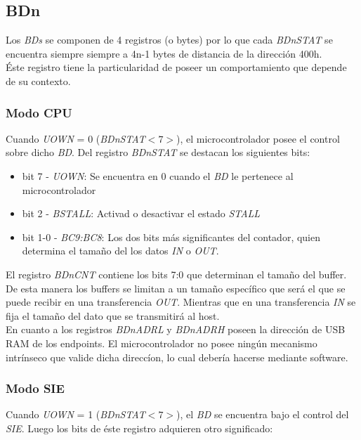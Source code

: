 \subsection{BDn}
Los \emph{BDs} se componen de 4 registros (o bytes) por lo que cada
\emph{BDnSTAT} se encuentra siempre siempre a 4n-1 bytes de distancia de la
direcci\'on 400h.\\

\'Este registro tiene la particularidad de poseer un comportamiento que
depende de su contexto.

\subsubsection{Modo CPU}
Cuando \emph{UOWN} = 0 (\emph{BDnSTAT$<7>$}), el microcontrolador posee el
control sobre dicho \emph{BD}. Del registro \emph{BDnSTAT} se destacan los
siguientes bits:

\begin{itemize}
 \item bit 7 - \emph{UOWN}: Se encuentra en 0 cuando el \emph{BD} le pertenece
al microcontrolador

 \item bit 2 - \emph{BSTALL}: Activad o desactivar el estado \emph{STALL}

 \item bit 1-0 - \emph{BC9:BC8}: Los dos bits m\'as significantes del
contador, quien determina el tama\~no del los datos \emph{IN} o \emph{OUT}.
\end{itemize}

El registro \emph{BDnCNT} contiene los bits 7:0 que determinan el tama\~no del
buffer. De esta manera los buffers se limitan a un tama\~no espec\'ifico que
ser\'a el que se puede recibir en una transferencia \emph{OUT}. Mientras que
en una transferencia \emph{IN} se fija el tama\~no del dato que se
transmitir\'a al host.\\

En cuanto a los registros \emph{BDnADRL} y \emph{BDnADRH} poseen la
direcci\'on de USB RAM de los endpoints. El microcontrolador no posee ning\'un
mecanismo intr\'inseco que valide dicha direcc\'ion, lo cual deber\'ia hacerse
mediante software.\\

\subsubsection{Modo SIE}
Cuando \emph{UOWN} = 1 (\emph{BDnSTAT$<7>$}), el \emph{BD} se encuentra bajo
el control del \emph{SIE}. Luego los bits de \'este registro adquieren otro
significado:

